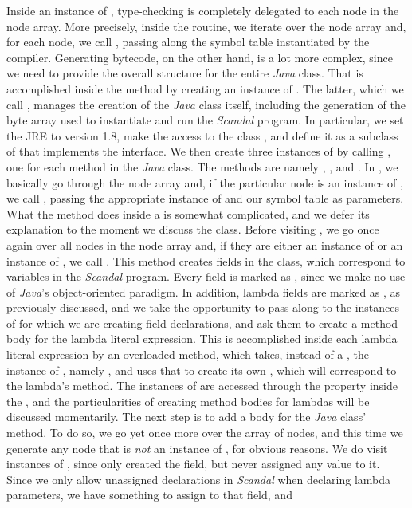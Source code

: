 Inside an instance of , type-checking is completely delegated to each node in the node array. More precisely, inside the  routine, we iterate over the node array and, for each node, we call , passing along the symbol table instantiated by the compiler. Generating bytecode, on the other hand, is a lot more complex, since we need to provide the overall structure for the entire \emph{Java} class. That is accomplished inside the  method by creating an instance of . The latter, which we call , manages the creation of the \emph{Java} class itself, including the generation of the byte array used to instantiate and run the \emph{Scandal} program. In particular, we set the JRE to version 1.8, make the access to the class , and define it as a subclass of  that implements the  interface. We then create three instances of  by calling , one for each method in the \emph{Java} class. The methods are namely , , and . In , we basically go through the node array and, if the particular node is an instance of , we call , passing the appropriate instance of  and our symbol table as parameters. What the  method does inside a  is somewhat complicated, and we defer its explanation to the moment we discuss the  class. Before visiting , we go once again over all nodes in the node array and, if they are either an instance of  or an instance of , we call . This method creates fields in the  class, which correspond to  variables in the \emph{Scandal} program. Every field is marked as , since we make no use of \emph{Java}'s object-oriented paradigm. In addition, lambda fields are marked as , as previously discussed, and we take the opportunity to pass  along to the instances of  for which we are creating field declarations, and ask them to create a method body for the lambda literal expression. This is accomplished inside each lambda literal expression by an overloaded  method, which takes, instead of a , the instance of , namely , and uses that to create its own , which will correspond to the lambda's method. The instances of  are accessed through the  property inside the , and the particularities of creating method bodies for lambdas will be discussed momentarily. The next step is to add a body for the \emph{Java} class'  method. To do so, we go yet once more over the array of nodes, and this time we generate any node that is \emph{not} an instance of , for obvious reasons. We do visit instances of , since  only created the field, but never assigned any value to it. Since we only allow unassigned declarations in \emph{Scandal} when declaring lambda parameters, we have something to assign to that field, and  